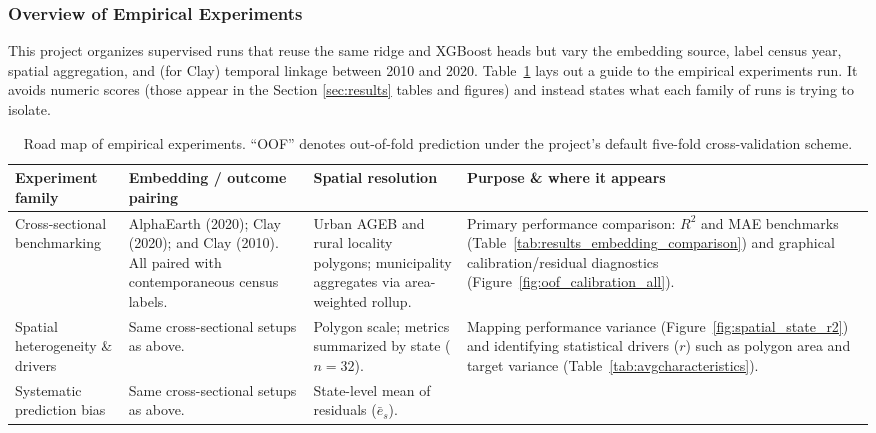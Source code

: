 \documentclass[12pt,letterpaper]{article}
\begin{document}
\subsubsection{Overview of Empirical Experiments}
\label{subsec:experiment-overview}

This project organizes supervised runs that reuse the same ridge and XGBoost heads but vary the embedding source, label census year, spatial aggregation, and (for Clay) temporal linkage between 2010 and 2020. Table~\ref{tab:experiment_overview} lays out a guide to the empirical experiments run. It avoids numeric scores (those appear in the Section \ref{sec:results} tables and figures) and instead states what each family of runs is trying to isolate.

\begin{table}[H]
  \centering
  \caption{Road map of empirical experiments. ``OOF'' denotes out-of-fold prediction under the project's default five-fold cross-validation scheme.}
  \label{tab:experiment_overview}
  \footnotesize
  \renewcommand{\arraystretch}{1.2}
  \setlength{\tabcolsep}{5pt}
  \begin{tabular}{@{} >{\raggedright\arraybackslash}p{} >{\raggedright\arraybackslash}p{} >{\raggedright\arraybackslash}p{} >{\raggedright\arraybackslash}p{} @{}}
    \toprule
    \textbf{Experiment family} & 
    \textbf{Embedding / outcome pairing} & 
    \textbf{Spatial resolution} & 
    \textbf{Purpose \& where it appears} \\
    \midrule
    Cross-sectional benchmarking & 
    AlphaEarth (2020); Clay (2020); and Clay (2010). All paired with contemporaneous census labels. & 
    Urban AGEB and rural locality polygons; municipality aggregates via area-weighted rollup. & 
    Primary performance comparison: $R^2$ and MAE benchmarks (Table~\ref{tab:results_embedding_comparison}) and graphical calibration/residual diagnostics (Figure~\ref{fig:oof_calibration_all}). \\
    \addlinespace[3pt]
    Spatial heterogeneity \& drivers & 
    Same cross-sectional setups as above. & 
    Polygon scale; metrics summarized by state ($n=32$). & 
    Mapping performance variance (Figure~\ref{fig:spatial_state_r2}) and identifying statistical drivers ($r$) such as polygon area and target variance (Table~\ref{tab:avgcharacteristics}). \\
    \addlinespace[3pt]
    Systematic prediction bias & 
    Same cross-sectional setups as above. & 
    State-level mean of residuals ($\bar{e}_s$). & 

\end{tabular}
\end{table}
\end{document}
